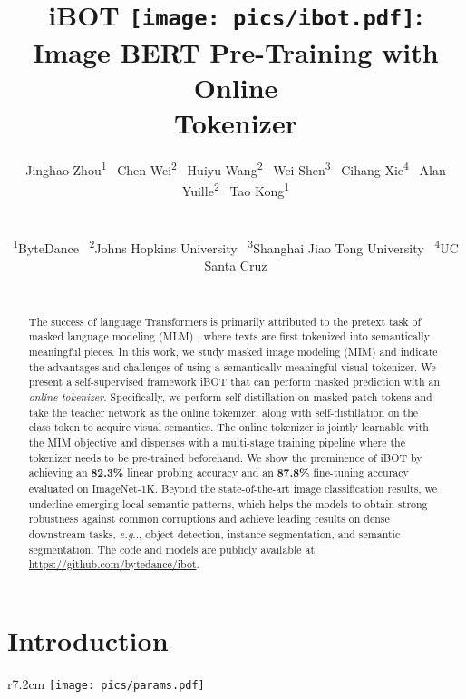 \documentclass{article} \usepackage{iclr2022_conference,times}
\title{
iBOT \texttt{[image: pics/ibot.pdf]}: 
Image BERT Pre-Training with Online \\ Tokenizer
}
\author{\hspace{-2ex}
\centerline{Jinghao Zhou\textsuperscript{\rm 1} \ Chen Wei\textsuperscript{\rm 2} \ Huiyu Wang\textsuperscript{\rm 2} \ Wei Shen\textsuperscript{\rm 3} \ Cihang Xie\textsuperscript{\rm 4} \ Alan Yuille\textsuperscript{\rm 2} \ Tao Kong\textsuperscript{\rm 1}} \\
\centerline{\hspace{-2ex}\textsuperscript{\rm 1}ByteDance \ \textsuperscript{\rm 2}Johns Hopkins University \ \textsuperscript{\rm 3}Shanghai Jiao Tong University \ \textsuperscript{\rm 4}UC Santa Cruz} \\ 
}
\makeatletter
\def\ourmethod{{iBOT}\xspace}
\DeclareRobustCommand\onedot{\futurelet\@let@token\@onedot}
\def\@onedot{\ifx\@let@token.\else.\null\fi\xspace}
\def\eg{\emph{e.g}\onedot} \def\Eg{\emph{E.g}\onedot}
\makeatother
\begin{document}
\maketitle

{\let\thefootnote\relax{}}

\vspace{-0.1cm}
\begin{abstract}
The success of language Transformers is primarily attributed to the pretext task of masked language modeling (MLM) \citep{bert}, where texts are first tokenized into semantically meaningful pieces.
In this work, we study masked image modeling (MIM) and indicate the advantages and challenges of using a semantically meaningful visual tokenizer.
We present a self-supervised framework \ourmethod that can perform masked prediction with an \textit{online tokenizer}. 
Specifically, we perform self-distillation on masked patch tokens and take the teacher network as the online tokenizer, along with self-distillation on the class token to acquire visual semantics.
The online tokenizer is jointly learnable with the MIM objective and dispenses with a multi-stage training pipeline where the tokenizer needs to be pre-trained beforehand.
We show the prominence of \ourmethod by achieving an \textbf{82.3\%} linear probing accuracy and an \textbf{87.8\%} fine-tuning accuracy evaluated on ImageNet-1K.
Beyond the state-of-the-art image classification results, we underline emerging local semantic patterns, which helps the models to obtain strong robustness against common corruptions and achieve leading results on dense downstream tasks, \eg, 
object detection, instance segmentation, and semantic segmentation.
The code and models are publicly available at \href{https://github.com/bytedance/ibot}{https://github.com/bytedance/ibot}.
\end{abstract}

\vspace{-0.1cm}
\section{Introduction}

\begin{wrapfigure}{r}{7.2cm}
\centering
\vspace{-1.2cm}
\texttt{[image: pics/params.pdf]}
\vspace{-0.8cm}
\caption{\textbf{Linear probing accuracy on ImageNet.} 
We compare \ourmethod with other unsupervised baselines.
}
\vspace{-0.5cm}
\label{fig:param}
\end{wrapfigure}
\end{document}
